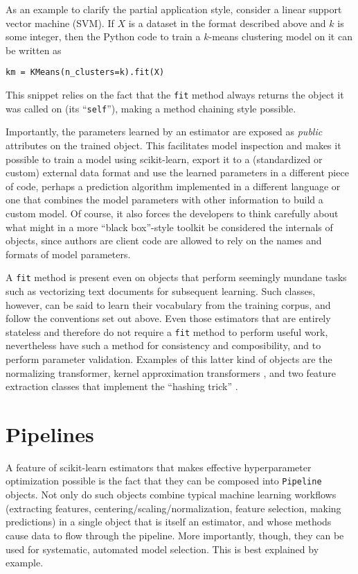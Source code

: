\documentclass[a4paper,twocolumn]{article}
\begin{document}
As an example to clarify the partial application style,
consider a linear support vector machine (SVM).
If $X$ is a dataset in the format described above and $k$ is some integer,
then the Python code to train a $k$-means clustering model on it
can be written as
\begin{verbatim}
km = KMeans(n_clusters=k).fit(X)
\end{verbatim}
This snippet relies on the fact that the \texttt{fit} method
always returns the object it was called on (its ``\texttt{self}''),
making a method chaining style possible.

Importantly, the parameters learned by an estimator
are exposed as \textit{public} attributes on the trained object.
This facilitates model inspection
and makes it possible to train a model using scikit-learn,
export it to a (standardized or custom) external data format
and use the learned parameters in a different piece of code,
perhaps a prediction algorithm implemented in a different language
or one that combines the model parameters with other information
to build a custom model.
Of course, it also forces the developers to think carefully
about what might in a more ``black box''-style toolkit
be considered the internals of objects,
since authors are client code are allowed to rely
on the names and formats of model parameters.

A \texttt{fit} method is present even on objects
that perform seemingly mundane tasks such as vectorizing text documents
for subsequent learning.
Such classes, however, can be said to learn their vocabulary
from the training corpus,
and follow the conventions set out above.
Even those estimators that are entirely stateless and therefore
do not require a \texttt{fit} method to perform useful work,
nevertheless have such a method for consistency and composibility,
and to perform parameter validation.
Examples of this latter kind of objects are the normalizing transformer,
kernel approximation transformers
\citep{rahimi2007random, li2010random, vedaldi2010efficient},
and two feature extraction classes that implement the ``hashing trick''
\citep{weinberger2009}.

\section{Pipelines}

A feature of scikit-learn estimators
that makes effective hyperparameter optimization possible
is the fact that they can be composed into \texttt{Pipeline} objects.
Not only do such objects combine typical machine learning workflows
(extracting features, centering/scaling/normalization,
feature selection, making predictions)
in a single object that is itself an estimator,
and whose methods cause data to flow through the pipeline.
More importantly, though, they can be used for
systematic, automated model selection.
This is best explained by example.
\end{document}
